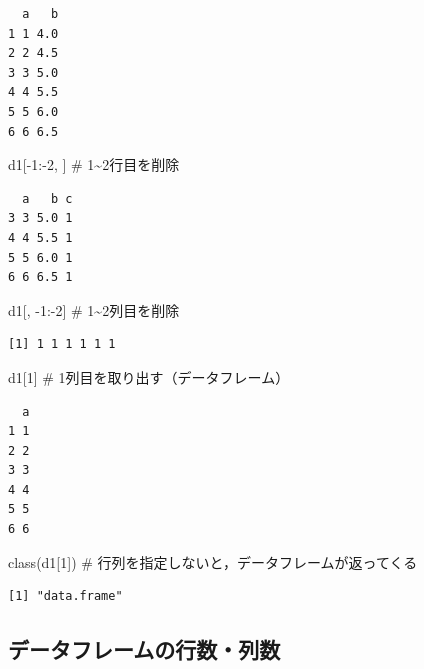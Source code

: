 \documentclass[
  letterpaper,
  DIV=11,
  numbers=noendperiod]{scrreprt}
\newenvironment{Shaded}{\begin{snugshade}}{\end{snugshade}}
\newcommand{\CommentTok}[1]{\textcolor[rgb]{0.37,0.37,0.37}{#1}}
\newcommand{\DecValTok}[1]{\textcolor[rgb]{0.68,0.00,0.00}{#1}}
\newcommand{\FunctionTok}[1]{\textcolor[rgb]{0.28,0.35,0.67}{#1}}
\newcommand{\NormalTok}[1]{\textcolor[rgb]{0.00,0.23,0.31}{#1}}
\newcommand{\SpecialCharTok}[1]{\textcolor[rgb]{0.37,0.37,0.37}{#1}}
\begin{document}
\begin{verbatim}
  a   b
1 1 4.0
2 2 4.5
3 3 5.0
4 4 5.5
5 5 6.0
6 6 6.5
\end{verbatim}

\begin{Shaded}
\begin{Highlighting}[]
\NormalTok{d1[}\SpecialCharTok{{-}}\DecValTok{1}\SpecialCharTok{:{-}}\DecValTok{2}\NormalTok{, ] }\CommentTok{\# 1\textasciitilde{}2行目を削除}
\end{Highlighting}
\end{Shaded}

\begin{verbatim}
  a   b c
3 3 5.0 1
4 4 5.5 1
5 5 6.0 1
6 6 6.5 1
\end{verbatim}

\begin{Shaded}
\begin{Highlighting}[]
\NormalTok{d1[, }\SpecialCharTok{{-}}\DecValTok{1}\SpecialCharTok{:{-}}\DecValTok{2}\NormalTok{] }\CommentTok{\# 1\textasciitilde{}2列目を削除}
\end{Highlighting}
\end{Shaded}

\begin{verbatim}
[1] 1 1 1 1 1 1
\end{verbatim}

\begin{Shaded}
\begin{Highlighting}[]
\NormalTok{d1[}\DecValTok{1}\NormalTok{] }\CommentTok{\# 1列目を取り出す（データフレーム）}
\end{Highlighting}
\end{Shaded}

\begin{verbatim}
  a
1 1
2 2
3 3
4 4
5 5
6 6
\end{verbatim}

\begin{Shaded}
\begin{Highlighting}[]
\FunctionTok{class}\NormalTok{(d1[}\DecValTok{1}\NormalTok{]) }\CommentTok{\# 行列を指定しないと，データフレームが返ってくる}
\end{Highlighting}
\end{Shaded}

\begin{verbatim}
[1] "data.frame"
\end{verbatim}

\hypertarget{ux30c7ux30fcux30bfux30d5ux30ecux30fcux30e0ux306eux884cux6570ux5217ux6570}{%
\subsection{データフレームの行数・列数}\label{ux30c7ux30fcux30bfux30d5ux30ecux30fcux30e0ux306eux884cux6570ux5217ux6570}}
\end{document}
